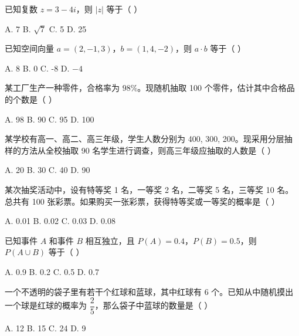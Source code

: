 \documentclass[11pt, a4paper]{article}
\begin{document}
\begin{baitap}[27]
已知复数 $z = 3 - 4i$，则 $\lvert z \rvert$ 等于（ ）
\par\vspace{3pt}
\noindent A. 7 \quad B. $\sqrt{7}$ \quad C. 5 \quad D. 25
\end{baitap}

\begin{baitap}[28]
已知空间向量 $a = (2, -1, 3)$，$b = (1, 4, -2)$，则 $a \cdot b$ 等于（ ）
\par\vspace{3pt}
\noindent A. 8 \quad B. 0 \quad C. -8 \quad D. $-4$
\end{baitap}

\begin{baitap}[29]
某工厂生产一种零件，合格率为 $98\%$。现随机抽取 100 个零件，估计其中合格品的个数是（ ）
\par\vspace{3pt}
\noindent A. 98 \quad B. 90 \quad C. 95 \quad D. 100
\end{baitap}

\begin{baitap}[30]
某学校有高一、高二、高三年级，学生人数分别为 400, 300, 200。现采用分层抽样的方法从全校抽取 90 名学生进行调查，则高三年级应抽取的人数是（ ）
\par\vspace{3pt}
\noindent A. 20 \quad B. 30 \quad C. 40 \quad D. 90
\end{baitap}

\begin{baitap}[31]
某次抽奖活动中，设有特等奖 1 名，一等奖 2 名，二等奖 5 名，三等奖 10 名。总共有 100 张彩票。如果购买一张彩票，获得特等奖或一等奖的概率是（ ）
\par\vspace{3pt}
\noindent A. 0.01 \quad B. 0.02 \quad C. 0.03 \quad D. 0.08
\end{baitap}

\begin{baitap}[32]
已知事件 $A$ 和事件 $B$ 相互独立，且 $P(A) = 0.4$，$P(B) = 0.5$，则 $P(A \cup B)$ 等于（ ）
\par\vspace{3pt}
\noindent A. 0.9 \quad B. 0.2 \quad C. 0.5 \quad D. 0.7
\end{baitap}

\begin{baitap}[33]
一个不透明的袋子里有若干个红球和蓝球，其中红球有 6 个。已知从中随机摸出一个球是红球的概率为 $\dfrac{2}{5}$，那么袋子中蓝球的数量是（ ）
\par\vspace{3pt}
\noindent A. 12 \quad B. 15 \quad C. 24 \quad D. 9
\end{baitap}
\end{document}
